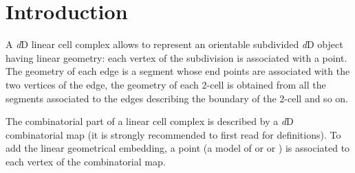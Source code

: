 \providecommand{\cell}[1]{\emph{#1}-cell}
\providecommand{\cells}[1]{\emph{#1}-cells}
\providecommand{\orbit}[1]{\ccTexHtml{$\langle{}$}{&lang;}#1\ccTexHtml{$\rangle{}$}{&rang;}}




\section{Introduction}

A \emph{d}D linear cell complex allows to represent an orientable
subdivided \emph{d}D object having linear geometry: each vertex of the
subdivision is associated with a point. The geometry of each edge is a
segment whose end points are associated with the two vertices of the
edge, the geometry of each 2-cell is obtained from all the segments
associated to the edges describing the boundary of the 2-cell and so
on.

The combinatorial part of a linear cell complex is described by a
\emph{d}D combinatorial map (it is strongly recommended to first
read 
for definitions).  To add
the linear geometrical embedding, a point (a model of
 or  or ) is
associated to each vertex of the combinatorial map.

